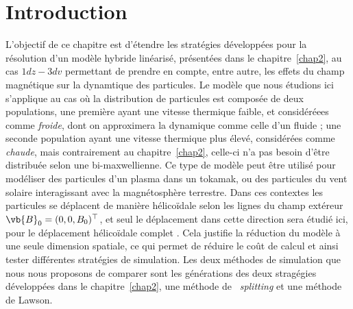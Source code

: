
\section{Introduction}

L'objectif de ce chapitre est d'étendre les stratégies développées pour la résolution d'un modèle hybride linéarisé, présentées dans le chapitre~\ref{chap2}, au cas $1dz-3dv$ permettant de prendre en compte, entre autre, les effets du champ magnétique sur la dynamtique des particules. Le modèle que nous étudions ici s'applique au cas où la distribution de particules est composée de deux populations, une première ayant une vitesse thermique faible, et considéréees comme \emph{froide}, dont on approximera la dynamique comme celle d'un fluide ; une seconde population ayant une vitesse thermique plus élevé, considérées comme \emph{chaude}, mais contrairement au chapitre~\ref{chap2}, celle-ci n'a pas besoin d'être distribuée selon une bi-maxwellienne. Ce type de modèle peut être utilisé pour modéliser des particules d'un plasma dans un tokamak, ou des particules du vent solaire interagissant avec la magnétosphère terrestre. Dans ces contextes les particules se déplacent de manière hélicoïdale selon les lignes du champ extéreur $\vb{B}_0 = (0,0,B_0)^\top$, et seul le déplacement dans cette direction sera étudié ici, pour le déplacement hélicoïdale complet . Cela justifie la réduction du modèle à une seule dimension spatiale, ce qui permet de réduire le coût de calcul et ainsi tester différentes stratégies de simulation. Les deux méthodes de simulation que nous nous proposons de comparer sont les générations des deux stragégies développées dans le chapitre~\ref{chap2}, une méthode de ~\emph{splitting} et une méthode de Lawson.
